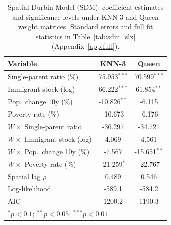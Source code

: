 \begin{table}[ht]
\centering
\caption{Spatial Durbin Model (SDM): coefficient estimates and significance levels under KNN-3 and Queen weight matrices. Standard errors and full fit statistics in Table~\ref{tab:sdm_slx} (Appendix~\ref{app:full}).}
\label{tab:sdm_compact}
\begin{tabular}{lcc}
  \toprule
  Variable & KNN-3 & Queen \\
  \midrule
  \rowcolor{gray!15}Single-parent ratio (\%) & 75.953$^{***}$ & 70.599$^{***}$ \\
  \rowcolor{gray!15}Immigrant stock (log) & 66.222$^{***}$ & 61.854$^{**}$ \\
  Pop.~change 10y (\%) & -10.826$^{**}$ & -6.115 \\
  Poverty rate (\%) & -10.673 & -6.176 \\
  \midrule
  $W\!\times\!$ Single-parent ratio & -36.297 & -34.721 \\
  $W\!\times\!$ Immigrant stock (log) & 4.069 & 4.561 \\
  \rowcolor{gray!15}$W\!\times\!$ Pop.~change 10y (\%) & -7.567 & -15.651$^{**}$ \\
  $W\!\times\!$ Poverty rate (\%) & -21.259$^{*}$ & -22.767 \\
  \midrule
  \rowcolor{gray!15}Spatial lag $\rho$ & 0.489 & 0.546 \\
  Log-likelihood & -589.1 & -584.2 \\
  AIC & 1200.2 & 1190.3 \\
  \bottomrule
  \multicolumn{3}{l}{\scriptsize $^{*}p<0.1$;\; $^{**}p<0.05$;\; $^{***}p<0.01$} \\
\end{tabular}
\end{table}
